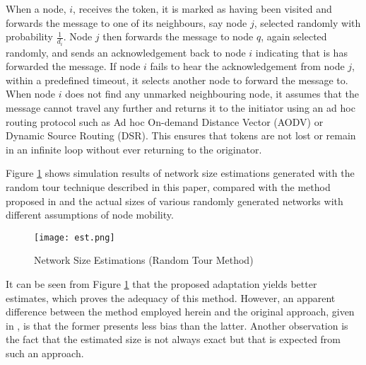 \documentclass[twocolumn,10pt,conference]{IEEEtran}
\begin{document}
When a node, $i$, receives the token, it is marked as having been visited and forwards the message to one of its 
neighbours, say node $j$, selected randomly with probability $\frac{1}{d_i}$. Node $j$ then forwards the message to node 
$q$, again selected randomly, and sends an acknowledgement back to node $i$ indicating that is has forwarded the message. If node $i$ 
fails to hear the acknowledgement from node $j$, within a predefined timeout, it selects another node to forward the 
message to. When node $i$ does not find any unmarked neighbouring node, it assumes that the message cannot travel 
any further and returns it to the initiator using an ad hoc routing protocol such as Ad hoc On-demand Distance Vector (AODV) or Dynamic Source Routing (DSR). This ensures that tokens are not lost or remain in an infinite loop without ever returning to the originator.  

Figure \ref{random_tour} shows simulation results of network size estimations generated with the random tour technique described in this 
paper, compared with the method proposed in \cite{ref20} and the actual sizes of various randomly generated networks 
with different assumptions of node mobility. 
\begin{figure}[h!]
\begin{center}
\texttt{[image: est.png]}
\caption{Network Size Estimations (Random Tour Method)}
\label{random_tour}
\end{center}
\end{figure}

It can be seen from Figure \ref{random_tour} that the proposed adaptation yields better estimates, which 
proves the adequacy of this method. However, an apparent difference between the method employed herein and the original 
approach, given in \cite{ref20}, is that the former presents less bias than the latter. Another observation is the fact that 
the estimated size is not always exact but that is expected from such an approach.
\end{document}
